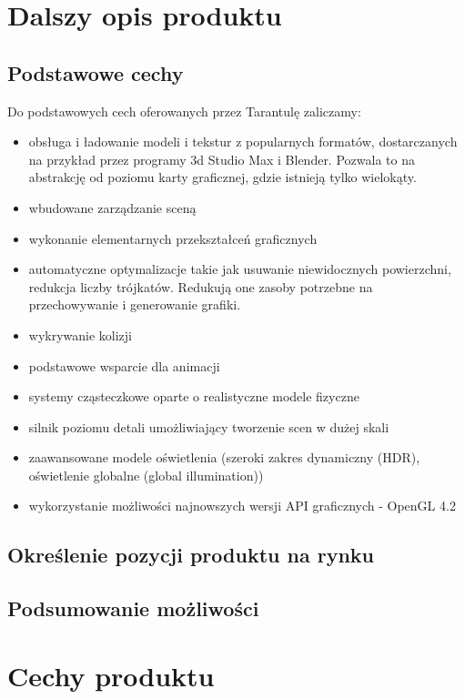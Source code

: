 \documentclass[11pt,leqno]{article}
\begin{document}
\section{Dalszy opis produktu}

\subsection{Podstawowe cechy}
Do podstawowych cech oferowanych przez Tarantulę zaliczamy:
\begin{itemize}
 \item obsługa i ładowanie modeli i tekstur z popularnych formatów, dostarczanych na przykład przez programy 3d Studio Max i Blender. 
 Pozwala to na abstrakcję od poziomu karty graficznej, gdzie istnieją tylko wielokąty.
  \item wbudowane zarządzanie sceną
\item wykonanie elementarnych przekształceń graficznych
\item automatyczne optymalizacje takie jak usuwanie niewidocznych powierzchni, redukcja liczby trójkatów. Redukują one zasoby potrzebne na przechowywanie i generowanie grafiki.
\item wykrywanie kolizji
\item podstawowe wsparcie dla animacji
\item systemy cząsteczkowe oparte o realistyczne modele fizyczne
\item silnik poziomu detali umożliwiający tworzenie scen w dużej skali
\item zaawansowane modele oświetlenia (szeroki zakres dynamiczny (HDR), oświetlenie globalne (global illumination))
\item wykorzystanie możliwości najnowszych wersji API graficznych  - OpenGL 4.2
\end{itemize}

\subsection{Określenie pozycji produktu na rynku}

\subsection{Podsumowanie możliwości}


\section{Cechy produktu}
\end{document}

